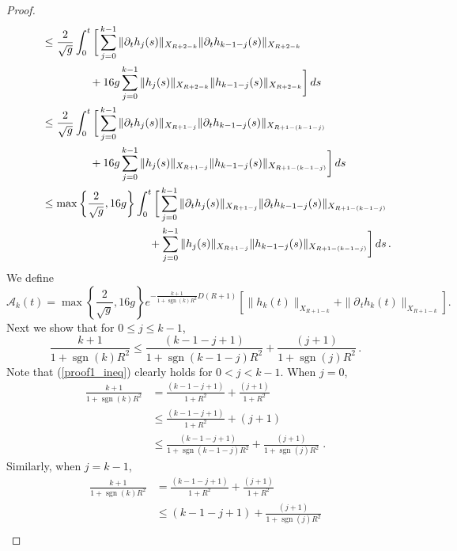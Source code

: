 \documentclass[11pt]{article}
\theoremstyle{plain}
\theoremstyle{definition}
\theoremstyle{definition}
\def\p{\text{\bf\emph{p}}}
\DeclareMathOperator{\sgn}{sgn}
\def\p{{\partial\hspace{1pt}}}
\begin{document}
\begin{proof}
\begin{align}
&\qquad\leq \frac{2}{\sqrt{g}}\int_0^t\bigg{[}\sum_{j=0}^{k-1}\|\p_{\!t}h_{j}(s)\|_{X_{R+2-k}}\|\p_{\!t}h_{k-1-j}(s)\|_{X_{R+2-k}}
\nonumber\\
&\qquad\qquad\qquad\ +16g\sum_{j=0}^{k-1}\|h_{j}(s)\|_{X_{R+2-k}}\|h_{k-1-j}(s)\|_{X_{R+2-k}}\bigg{]}\,ds\nonumber\\
&\qquad\leq \frac{2}{\sqrt{g}}\int_0^t\bigg{[}\sum_{j=0}^{k-1}\|\p_{\!t}h_{j}(s)\|_{X_{R+1-j}}\|\p_{\!t}h_{k-1-j}(s)\|_{X_{R+1-(k-1-j)}}\nonumber\\
&\qquad\qquad\qquad\ +16g\sum_{j=0}^{k-1}\|h_{j}(s)\|_{X_{R+1-j}}\|h_{k-1-j}(s)\|_{X_{R+1-(k-1-j)}}\bigg{]}\,ds\nonumber\\
&\qquad\leq \max\left\{\frac{2}{\sqrt{g}},16g\right\}\int_0^t\bigg{[}\sum_{j=0}^{k-1}\|\p_{\!t}h_{j}(s)\|_{X_{R+1-j}}\|\p_{\!t}h_{k-1-j}(s)\|_{X_{R+1-(k-1-j)}}\nonumber\\
&\qquad\qquad\qquad\qquad\qquad\quad\ \ +\sum_{j=0}^{k-1}\|h_{j}(s)\|_{X_{R+1-j}}\|h_{k-1-j}(s)\|_{X_{R+1-(k-1-j)}}\bigg{]}\,ds\,.\label{eq:aux2}
\end{align}
We define
$$
\mathscr{A}_k(t)=\max\left\{\frac{2}{\sqrt{g}},16g\right\}e^{-\frac{k+1}{1+\sgn(k)R^2}D(R+1)}\left[\|h_k(t)\|_{X_{R+1-k}}+\|\p_{\!t} h_k(t)\|_{X_{R+1-k}}\right].
$$
Next we show that for $0\le j\le k-1$,
\begin{equation}\label{proof1_ineq}
\frac{k+1}{1+\sgn(k)R^2}\leq \frac{\left(k-1-j+1\right)}{1+\sgn(k-1-j)R^2}+\frac{(j+1)}{1+\sgn(j)R^2}\,.
\end{equation}
Note that (\ref{proof1_ineq}) clearly holds for $0 < j < k-1$.
When $j=0$,
\begin{align*}
\frac{k+1}{1+\sgn(k)R^2}&=\frac{\left(k-1-j+1\right)}{1+R^2}+\frac{(j+1)}{1+R^2}\\
&\leq \frac{\left(k-1-j+1\right)}{1+R^2}+(j+1)\\
&\leq \frac{\left(k-1-j+1\right)}{1+\sgn(k-1-j)R^2}+\frac{(j+1)}{1+\sgn(j)R^2}\;.
\end{align*}
Similarly, when $j=k-1$,
\begin{align*}
\frac{k+1}{1+\sgn(k)R^2}&=\frac{\left(k-1-j+1\right)}{1+R^2}+\frac{(j+1)}{1+R^2}\\
&\leq \left(k-1-j+1\right)+\frac{(j+1)}{1+\sgn(j)R^2}\\

\end{align*}
\end{proof}
\end{document}
